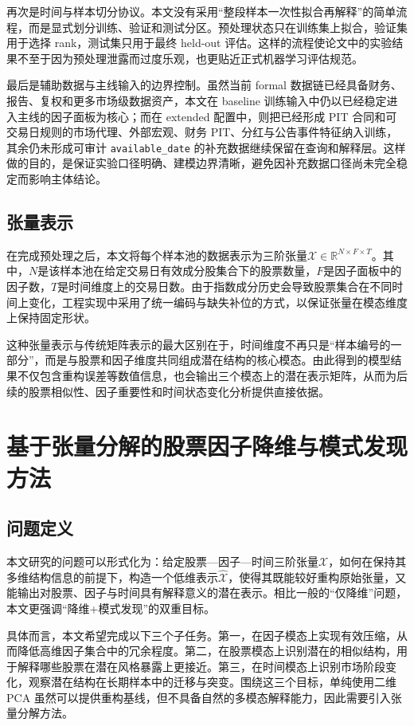 再次是时间与样本切分协议。本文没有采用“整段样本一次性拟合再解释”的简单流程，而是显式划分训练、验证和测试分区。预处理状态只在训练集上拟合，验证集用于选择 rank，测试集只用于最终 held-out 评估。这样的流程使论文中的实验结果不至于因为预处理泄露而过度乐观，也更贴近正式机器学习评估规范。

最后是辅助数据与主线输入的边界控制。虽然当前 formal 数据链已经具备财务、报告、复权和更多市场级数据资产，本文在 baseline 训练输入中仍以已经稳定进入主线的因子面板为核心；而在 extended 配置中，则把已经形成 PIT 合同和可交易日规则的市场代理、外部宏观、财务 PIT、分红与公告事件特征纳入训练，其余仍未形成可审计 \texttt{available\_date} 的补充数据继续保留在查询和解释层。这样做的目的，是保证实验口径明确、建模边界清晰，避免因补充数据口径尚未完全稳定而影响主体结论。

\section{张量表示}

在完成预处理之后，本文将每个样本池的数据表示为三阶张量$\mathcal{X}\in\mathbb{R}^{N\times F\times T}$。其中，$N$是该样本池在给定交易日有效成分股集合下的股票数量，$F$是因子面板中的因子数，$T$是时间维度上的交易日数。由于指数成分历史会导致股票集合在不同时间上变化，工程实现中采用了统一编码与缺失补位的方式，以保证张量在模态维度上保持固定形状。

这种张量表示与传统矩阵表示的最大区别在于，时间维度不再只是“样本编号的一部分”，而是与股票和因子维度共同组成潜在结构的核心模态。由此得到的模型结果不仅包含重构误差等数值信息，也会输出三个模态上的潜在表示矩阵，从而为后续的股票相似性、因子重要性和时间状态变化分析提供直接依据。

\chapter{基于张量分解的股票因子降维与模式发现方法}

\section{问题定义}

本文研究的问题可以形式化为：给定股票—因子—时间三阶张量$\mathcal{X}$，如何在保持其多维结构信息的前提下，构造一个低维表示$\hat{\mathcal{X}}$，使得其既能较好重构原始张量，又能输出对股票、因子与时间具有解释意义的潜在表示。相比一般的“仅降维”问题，本文更强调“降维+模式发现”的双重目标。

具体而言，本文希望完成以下三个子任务。第一，在因子模态上实现有效压缩，从而降低高维因子集合中的冗余程度。第二，在股票模态上识别潜在的相似结构，用于解释哪些股票在潜在风格暴露上更接近。第三，在时间模态上识别市场阶段变化，观察潜在结构在长期样本中的迁移与突变。围绕这三个目标，单纯使用二维 PCA 虽然可以提供重构基线，但不具备自然的多模态解释能力，因此需要引入张量分解方法。

